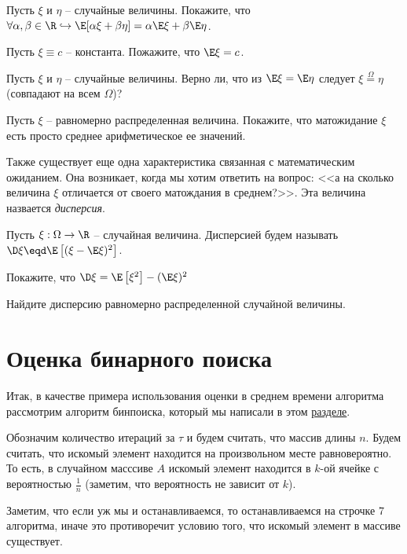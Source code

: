 \Exe Пусть $\xi$ и $\eta$ -- случайные величины. Покажите, что $\forall \alpha, \beta \in \R \hookrightarrow \E[\alpha \xi + \beta \eta] = \alpha \E \xi + \beta \E \eta$.

\Exe Пусть $\xi \equiv c$ -- константа. Пожажите, что $\E \xi = c$.

\Exe Пусть $\xi$ и $\eta$ -- случайные величины. Верно ли, что из $\E \xi = \E \eta$ следует $\xi \overset{\Omega}{=} \eta$ (совпадают на всем $\Omega$)?

\Exe Пусть $\xi$ -- равномерно распределенная величина. Покажите, что матожидание $\xi$ есть просто среднее арифметическое ее значений.

Также существует еще одна характеристика связанная с математическим ожиданием. Она возникает, когда мы хотим ответить на вопрос: <<а на сколько величина $\xi$ отличается от своего матождания в среднем?>>. Эта величина назвается \textit{дисперсия}.

\Def Пусть $\xi: \Omega \to \R$ -- случайная величина. Дисперсией будем называть $\D \xi \eqd \E \left[(\xi - \E \xi)^2\right]$.

\Exe Покажите, что $\D \xi = \E\left[\xi^2\right] - (\E\xi)^2$

\Exe Найдите дисперсию равномерно распределенной случайной величины.

\section{Оценка бинарного поиска}

Итак, в качестве примера использования оценки в среднем времени алгоритма рассмотрим алгоритм бинпоиска, который мы написали в этом \hyperref[sec:random-variables]{разделе}.

Обозначим количество итераций за $\tau$ и будем считать, что массив длины $n$. Будем считать, что искомый элемент находится на произвольном месте равновероятно. То есть, в случайном масссиве $A$ искомый элемент находится в $k$-ой ячейке с вероятностью $\frac{1}{n}$ (заметим, что  вероятность не зависит от $k$).

Заметим, что если уж мы и останавливаемся, то останавливаемся на строчке 7 алгоритма, иначе это противоречит условию того, что искомый элемент в массиве существует.

